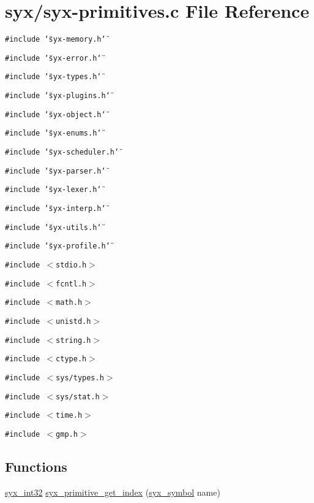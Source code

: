 \hypertarget{syx-primitives_8c}{
\section{syx/syx-primitives.c File Reference}
\label{syx-primitives_8c}
}
{\tt \#include \char`\"{}syx-memory.h\char`\"{}}\par
{\tt \#include \char`\"{}syx-error.h\char`\"{}}\par
{\tt \#include \char`\"{}syx-types.h\char`\"{}}\par
{\tt \#include \char`\"{}syx-plugins.h\char`\"{}}\par
{\tt \#include \char`\"{}syx-object.h\char`\"{}}\par
{\tt \#include \char`\"{}syx-enums.h\char`\"{}}\par
{\tt \#include \char`\"{}syx-scheduler.h\char`\"{}}\par
{\tt \#include \char`\"{}syx-parser.h\char`\"{}}\par
{\tt \#include \char`\"{}syx-lexer.h\char`\"{}}\par
{\tt \#include \char`\"{}syx-interp.h\char`\"{}}\par
{\tt \#include \char`\"{}syx-utils.h\char`\"{}}\par
{\tt \#include \char`\"{}syx-profile.h\char`\"{}}\par
{\tt \#include $<$stdio.h$>$}\par
{\tt \#include $<$fcntl.h$>$}\par
{\tt \#include $<$math.h$>$}\par
{\tt \#include $<$unistd.h$>$}\par
{\tt \#include $<$string.h$>$}\par
{\tt \#include $<$ctype.h$>$}\par
{\tt \#include $<$sys/types.h$>$}\par
{\tt \#include $<$sys/stat.h$>$}\par
{\tt \#include $<$time.h$>$}\par
{\tt \#include $<$gmp.h$>$}\par
\subsection*{Functions}
\begin{CompactItemize}
\item 
\hyperlink{syx-types_8h_9f31c17555a2dfcf25da84b5c4a2e55b}{syx\_\-int32} \hyperlink{syx-primitives_8c_c3af1a1fed278ee0e606de57cc0cbd2f}{syx\_\-primitive\_\-get\_\-index} (\hyperlink{syx-types_8h_9663af54b7b72f5d8be5f754ef356525}{syx\_\-symbol} name)
\end{CompactItemize}


